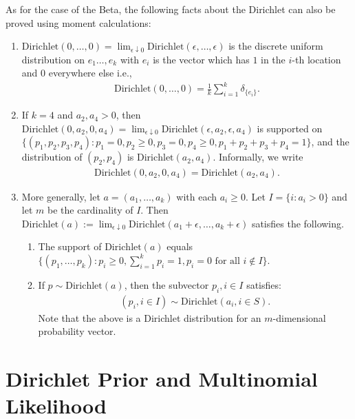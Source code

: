 \documentclass{scrartcl}
\begin{document}
As for the case of the Beta, the following facts about the Dirichlet
can also be proved using moment calculations:
\begin{enumerate}
\item $\text{Dirichlet}(0, \dots, 0) = \lim_{\epsilon \downarrow 0}
  \text{Dirichlet}(\epsilon, \dots, \epsilon)$ is the discrete uniform
  distribution on $e_1 \dots, e_k$ with $e_i$ is the vector which has
  $1$ in the $i$-th location and 0 everywhere else i.e.,
  \begin{align*}
    \text{Dirichlet}(0, \dots, 0) = \frac{1}{k} \sum_{i=1}^k
    \delta_{\{e_i\}}. 
  \end{align*}
\item If $k = 4$ and $a_2, a_4 > 0$, then $\text{Dirichlet}(0, a_2, 0,
  a_4) = \lim_{\epsilon \downarrow 0} \text{Dirichlet}(\epsilon, a_2,
  \epsilon, a_4)$ is supported on $\{(p_1, p_2, p_3, p_4) : p_1 = 0, p_2 \geq 0,
  p_3 = 0, p_4 \geq 0, p_1 + p_2 + p_3 + p_4 = 1 \}$, and the
  distribution of $(p_2, p_4)$ is $\text{Dirichlet}(a_2,
  a_4)$. Informally, we write
  \begin{align*}
    \text{Dirichlet}(0, a_2, 0, a_4) = \text{Dirichlet}(a_2, a_4). 
  \end{align*}
\item More generally, let $a = (a_1, \dots, a_k)$  with each $a_i \geq
  0$. Let $I = \{i: a_i > 0\}$ and let $m$ be the cardinality of
  $I$. Then $\text{Dirichlet}(a) := \lim_{\epsilon \downarrow 0}
  \text{Dirichlet}(a_1 + \epsilon, \dots, a_k + \epsilon)$ satisfies
  the following. 
  \begin{enumerate}
  \item The support of $\text{Dirichlet}(a)$ equals $\{(p_1, \dots,
    p_k): p_i \geq 0, \sum_{i=1}^k p_i = 1, p_i = 0 \text{ for all } i
    \notin I\}$.
  \item If $p \sim \text{Dirichlet}(a)$, then the subvector $p_i, i
    \in I$ satisfies:
    \begin{align*}
      (p_i, i \in I) \sim \text{Dirichlet}(a_i, i \in S). 
    \end{align*}
    Note that the above is a Dirichlet distribution for an
    $m$-dimensional probability vector. 
  \end{enumerate}
\end{enumerate}

\section{Dirichlet Prior and Multinomial Likelihood}
\end{document}
